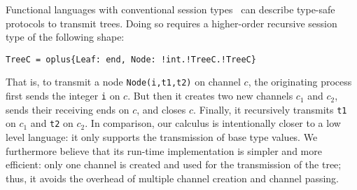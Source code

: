 Functional languages with conventional session
types~\cite{DBLP:journals/jfp/GayV10,DBLP:conf/esop/ToninhoCP13} can
describe type-safe protocols to transmit trees. Doing so
requires a higher-order recursive session type of the following shape:
\begin{lstlisting}
TreeC = oplus{Leaf: end, Node: !int.!TreeC.!TreeC}
\end{lstlisting}
That is, to transmit a node \lstinline|Node(i,t1,t2)| on channel $c$, the originating process first sends the
integer \lstinline|i| on $c$. But then it creates two new channels $c_1$ and $c_2$,
sends their receiving ends on $c$, and closes $c$. Finally, it
recursively transmits \lstinline|t1| on $c_1$ and \lstinline|t2| on
$c_2$.
In comparison, our calculus is intentionally closer to a low level
language: it only supports the transmission of base type values. We
furthermore believe that its run-time implementation is simpler and
more efficient: only one channel is created and used for the
transmission of the tree; thus, it avoids the overhead of multiple
channel creation and channel passing.

